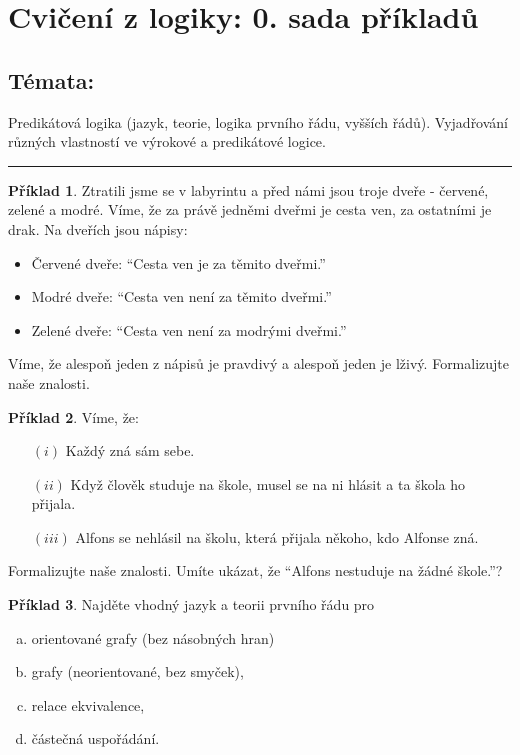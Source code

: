 \documentclass{amsart}
\theoremstyle{definition}
\newtheorem{problem}{Příklad}
\begin{document}
\section*{Cvičení z logiky: 0. sada příkladů}

\bigskip\bigskip

\subsection*{Témata:} 
Predikátová logika (jazyk, teorie, logika prvního řádu, vyšších řádů). Vyjadřování různých vlastností ve výrokové a predikátové logice.

\bigskip

\medskip\hrule\medskip


\begin{problem}
Ztratili jsme se v labyrintu a před námi jsou troje dveře - červené, zelené a modré. Víme, že za právě jedněmi dveřmi je cesta ven, za ostatními je drak. Na dveřích jsou nápisy:
\begin{itemize}
    \item Červené dveře: ``Cesta ven je za těmito dveřmi.''
    \item Modré dveře: ``Cesta ven není za těmito dveřmi.''
    \item Zelené dveře: ``Cesta ven není za modrými dveřmi.'' 
\end{itemize}
Víme, že alespoň jeden z nápisů je pravdivý a alespoň jeden je lživý. Formalizujte naše znalosti.
\end{problem}

\begin{problem} Víme, že:
\begin{enumerate}
\item[$(i)$] Každý zná sám sebe.
\item[$(ii)$] Když člověk studuje na škole, musel se na ni hlásit a ta škola ho přijala.
\item[$(iii)$] Alfons se nehlásil na školu, která přijala někoho, kdo Alfonse zná.
\end{enumerate}
Formalizujte naše znalosti. Umíte ukázat, že ``Alfons nestuduje na žádné škole.''?
\end{problem}
\smallskip


\begin{problem}
Najděte vhodný jazyk a teorii prvního řádu pro
\begin{enumerate}[a)]
    \item orientované grafy (bez násobných hran)
    \item grafy (neorientované, bez smyček),
    \item relace ekvivalence,
    \item částečná uspořádání.
\end{enumerate}
\end{problem}
\end{document}
